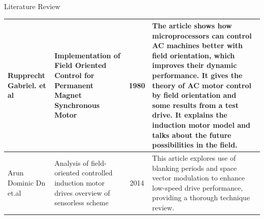 \begin{frame}{Literature Review}
\begin{center}
\begin{table}
\begin{tabular}{|p{1.4cm}|p{}|c|p{6cm}|}
				\vspace{0.005in}  Rupprecht Gabriel. et al & \vspace{0.005in} Implementation of Field Oriented Control for Permanent Magnet Synchronous Motor        & 1980                             & \vspace{0.04in} \RaggedRight The article shows how microprocessors can control AC machines better with field orientation, which improves their dynamic performance. It gives the theory of AC motor control by field orientation and some results from a test drive. It explains the induction motor model and talks about the future possibilities in the field. \vspace{0.04in} \\
				\hline
				\vspace{0.005in}  Arun Dominic Dn et.al    & Analysis of field-oriented controlled induction motor drives overview of sensorless scheme              & 2014                             & \vspace{0.04in} \RaggedRight This article  explores use of blanking periods and space vector modulation to enhance low-speed drive performance, providing a thorough technique review.                                                                                                                                                                                            \\
				\hline
			\end{tabular}
			\label{tab:lit-survey}
		\end{table}
	\end{center}
\end{frame}

